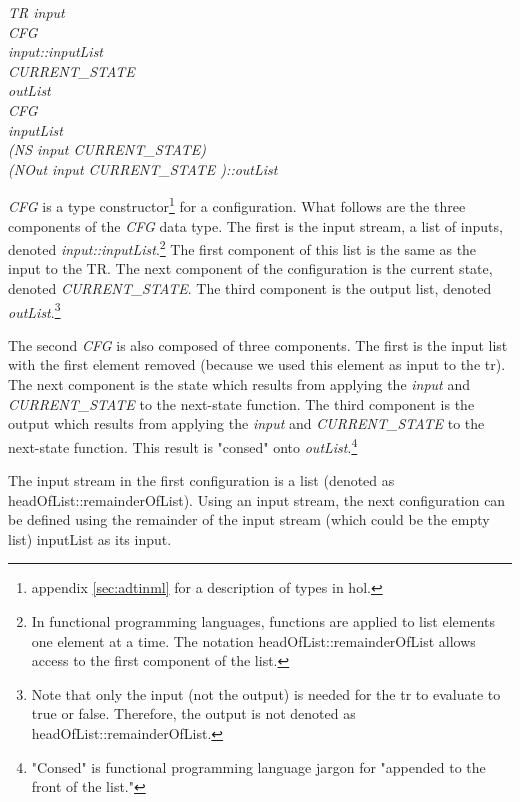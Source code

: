 \documentclass[../../main/main.tex]{subfiles}
\begin{document}
\emph{
TR input\\
\hspace{0.5cm}CFG \\
\hspace{1.5cm}input::inputList\\
\hspace{1.5cm}CURRENT_STATE\\
\hspace{1.5cm}outList\\
\hspace{0.5cm}CFG\\
\hspace{1.5cm}inputList\\
\hspace{1.5cm}(NS input CURRENT_STATE)\\
\hspace{1.5cm}(NOut input CURRENT_STATE )::outList
}

\emph{CFG} is a type constructor\footnote{\see appendix \ref{sec:adtinml} for a description of types in \gls{hol}.} for a configuration.  What follows are the three components of the \emph{CFG} data type.  The first is the input stream, a list of inputs, denoted \emph{input::inputList}.\footnote{In functional programming languages, functions are applied to list elements one element at a time.  The notation headOfList::remainderOfList allows access to the first component of the list.}  The first component of this list is the same as the input to the TR.  The next component of the configuration is the current state, denoted \emph{CURRENT_STATE}.  The third component is the output list, denoted \emph{outList}.\footnote{Note that only the input (not the output) is needed for the \gls{tr} to evaluate to true or false. Therefore, the output is not denoted as headOfList::remainderOfList.} 

The second \emph{CFG} is also composed of three components.  The first is the input list with the first element removed (because we used this element as input to the \gls{tr}).  The next component is the state which results from applying the \emph{input} and \emph{CURRENT_STATE} to the next-state function.  The third component is the output which results from applying the \emph{input} and \emph{CURRENT_STATE} to the next-state function.  This result is "consed" onto \emph{outList}.\footnote{"Consed" is functional programming language jargon for "appended to the front of the list."}

The input stream in the first configuration is a list (denoted as headOfList::remainderOfList).  Using an input stream, the next configuration can be defined using the remainder of the input stream (which could be the empty list) inputList as its input. 
\end{document}
